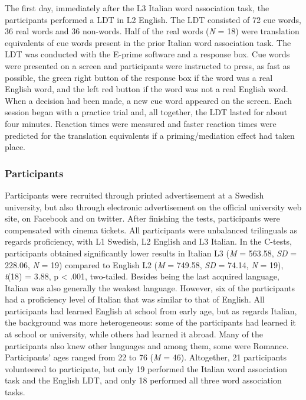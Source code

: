 \documentclass[output=paper,colorlinks,citecolor=brown,nonflat]{langsci/langscibook}
\begin{document}
The first day, immediately after the L3 Italian word association task, the participants performed a LDT in L2 English. The LDT consisted of 72 cue words, 36 real words and 36 non-words. Half of the real words (\textit{N} = 18) were translation equivalents of cue words present in the prior Italian word association task. The LDT was conducted with the E-prime software and a response box. Cue words were presented on a screen and participants were instructed to press, as fast as possible, the green right button of the response box if the word was a real English word, and the left red button if the word was not a real English word. When a decision had been made, a new cue word appeared on the screen. Each session began with a practice trial and, all together, the LDT lasted for about four minutes. Reaction times were measured and faster reaction times were predicted for the translation equivalents if a priming/mediation effect had taken place.

\subsubsection{Participants}\label{sec:gudmundson:2.2.2}

Participants were recruited through printed advertisement at a Swedish university, but also through electronic advertisement on the official university web site, on Facebook and on twitter. After finishing the tests, participants were compensated with cinema tickets. All participants were unbalanced trilinguals as regards proficiency, with L1 Swedish, L2 English and L3 Italian. In the C-tests, participants obtained significantly lower results in Italian L3 (\textit{M} = 563.58, \textit{SD} = 228.06, \textit{N} = 19) compared to English L2 (\textit{M} = 749.58, \textit{SD} = 74.14, \textit{N} = 19), \textit{t}(18) = 3.88, p < .001, two-tailed. Besides being the last acquired language, Italian was also generally the weakest language. However, six of the participants had a proficiency level of Italian that was similar to that of English. All participants had learned English at school from early age, but as regards Italian, the background was more heterogeneous: some of the participants had learned it at school or university, while others had learned it abroad. Many of the participants also knew other languages and among them, some were Romance. Participants’ ages ranged from 22 to 76 (\textit{M} = 46). Altogether, 21 participants volunteered to participate, but only 19 performed the Italian word association task and the English LDT, and only 18 performed all three word association tasks.
\end{document}
